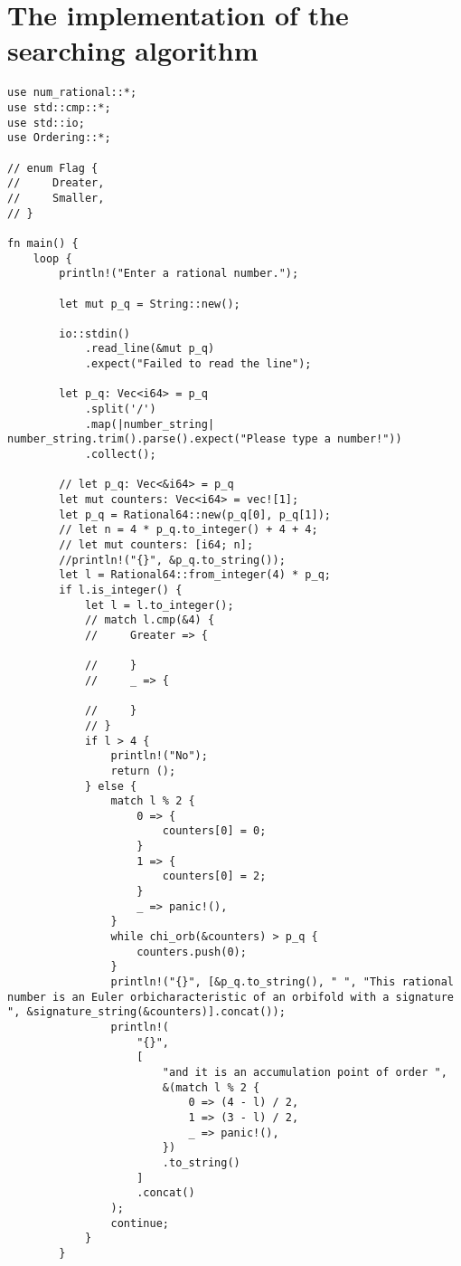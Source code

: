 \chapter{The implementation of the searching algorithm}
\begin{lstlisting}
use num_rational::*;
use std::cmp::*;
use std::io;
use Ordering::*;

// enum Flag {
//     Dreater,
//     Smaller,
// }

fn main() {
    loop {
        println!("Enter a rational number.");

        let mut p_q = String::new();

        io::stdin()
            .read_line(&mut p_q)
            .expect("Failed to read the line");

        let p_q: Vec<i64> = p_q
            .split('/')
            .map(|number_string| number_string.trim().parse().expect("Please type a number!"))
            .collect();

        // let p_q: Vec<&i64> = p_q
        let mut counters: Vec<i64> = vec![1];
        let p_q = Rational64::new(p_q[0], p_q[1]);
        // let n = 4 * p_q.to_integer() + 4 + 4;
        // let mut counters: [i64; n];
        //println!("{}", &p_q.to_string());
        let l = Rational64::from_integer(4) * p_q;
        if l.is_integer() {
            let l = l.to_integer();
            // match l.cmp(&4) {
            //     Greater => {

            //     }
            //     _ => {

            //     }
            // }
            if l > 4 {
                println!("No");
                return ();
            } else {
                match l % 2 {
                    0 => {
                        counters[0] = 0;
                    }
                    1 => {
                        counters[0] = 2;
                    }
                    _ => panic!(),
                }
                while chi_orb(&counters) > p_q {
                    counters.push(0);
                }
                println!("{}", [&p_q.to_string(), " ", "This rational number is an Euler orbicharacteristic of an orbifold with a signature ", &signature_string(&counters)].concat());
                println!(
                    "{}",
                    [
                        "and it is an accumulation point of order ",
                        &(match l % 2 {
                            0 => (4 - l) / 2,
                            1 => (3 - l) / 2,
                            _ => panic!(),
                        })
                        .to_string()
                    ]
                    .concat()
                );
                continue;
            }
        }


\end{lstlisting}
